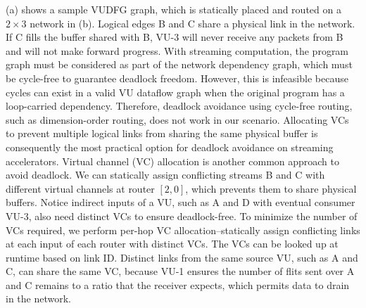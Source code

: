 (a) shows a sample VUDFG graph, which is statically placed and routed on a $2\times3$ network in (b). 
Logical edges B and C share a physical link in the network. If C fills the buffer shared with B, VU-3 will never receive any packets from B and will not make forward progress.
  With streaming computation, the program graph must be considered as part of the network dependency graph, which must be cycle-free to guarantee deadlock freedom. However, this is infeasible because cycles can exist in a valid VU dataflow graph when the original program has a loop-carried dependency. Therefore, deadlock avoidance using cycle-free routing, such as dimension-order routing, does not work in our scenario. 
Allocating VCs to prevent multiple logical links from sharing the same physical buffer is consequently the most practical option for deadlock avoidance on streaming accelerators.
Virtual channel (VC) allocation is another common approach to avoid deadlock. We can statically assign conflicting streams B and C with different
virtual channels at router $[2,0]$, which prevents them to share physical buffers. 
Notice indirect inputs of a VU, such as A and D with eventual consumer VU-3,
also need distinct VCs to ensure deadlock-free. To minimize the number of VCs required, we perform per-hop VC allocation--statically
assign conflicting links at each input of each router with distinct VCs. The VCs can be looked up at runtime based on link ID.
Distinct links from the same source VU, such as A and C, can share the same VC, because VU-1 ensures the number of flits sent over A and C remains
to a ratio that the receiver expects, which permits data to drain in the network.
\fi

